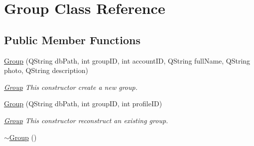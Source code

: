 \hypertarget{classGroup}{}\section{Group Class Reference}
\label{classGroup}
\subsection*{Public Member Functions}
\begin{DoxyCompactItemize}
\item 
\hyperlink{classGroup_ac2bb409a9f7c3778540bdd08d88ebea8}{Group} (Q\+String db\+Path, int group\+ID, int account\+ID, Q\+String full\+Name, Q\+String photo, Q\+String description)
\begin{DoxyCompactList}\small\item\em \hyperlink{classGroup}{Group} This constructor create a new group. \end{DoxyCompactList}\item 
\hyperlink{classGroup_a05b1908155299169d753831951514823}{Group} (Q\+String db\+Path, int group\+ID, int profile\+ID)
\begin{DoxyCompactList}\small\item\em \hyperlink{classGroup}{Group} This constructor reconstruct an existing group. \end{DoxyCompactList}\item 
\hyperlink{classGroup_aed00a22ff227ee2657ae44a5cbcedf7c}{$\sim$\+Group} ()\hypertarget{classGroup_aed00a22ff227ee2657ae44a5cbcedf7c}{}\label{classGroup_aed00a22ff227ee2657ae44a5cbcedf7c}


\end{DoxyCompactItemize}
